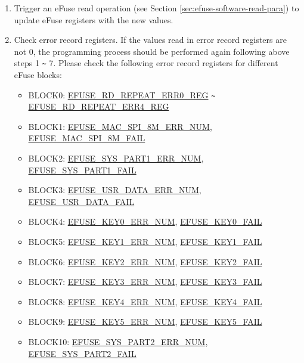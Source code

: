 \documentclass[main\_\_EN.tex]{subfiles}
\begin{document}
\begin{enumerate}
\item Trigger an eFuse read operation (see Section \ref{sec:efuse-software-read-para}) to update eFuse registers with the new values.
\item Check error record registers. If the values read in error record registers are not 0, the programming process should be performed again following above steps 1 \verb+~+ 7. Please check the following error record registers for different eFuse blocks:
\begin{itemize}
    \item BLOCK0: \hyperref[regdesc:EFUSERDREPEATERR0REG]{EFUSE\_RD\_REPEAT\_ERR0\_REG} \verb+~+ \hyperref[regdesc:EFUSERDREPEATERR4REG]{EFUSE\_RD\_REPEAT\_ERR4\_REG}
    \item BLOCK1: \hyperref[fielddesc:EFUSEMACSPI8MERRNUM] {EFUSE\_MAC\_SPI\_8M\_ERR\_NUM}, \hyperref[fielddesc:EFUSEMACSPI8MFAIL] {EFUSE\_MAC\_SPI\_8M\_FAIL}
    \item BLOCK2: \hyperref[fielddesc:EFUSESYSPART1ERRNUM] {EFUSE\_SYS\_PART1\_ERR\_NUM}, \hyperref[fielddesc:EFUSESYSPART1FAIL] {EFUSE\_SYS\_PART1\_FAIL}
    \item BLOCK3: \hyperref[fielddesc:EFUSEUSRDATAERRNUM] {EFUSE\_USR\_DATA\_ERR\_NUM}, \hyperref[fielddesc:EFUSEUSRDATAFAIL] {EFUSE\_USR\_DATA\_FAIL}
    \item BLOCK4: \hyperref[fielddesc:EFUSEKEY0ERRNUM] {EFUSE\_KEY0\_ERR\_NUM}, \hyperref[fielddesc:EFUSEKEY0FAIL] {EFUSE\_KEY0\_FAIL}
    \item BLOCK5: \hyperref[fielddesc:EFUSEKEY1ERRNUM] {EFUSE\_KEY1\_ERR\_NUM}, \hyperref[fielddesc:EFUSEKEY1FAIL] {EFUSE\_KEY1\_FAIL}
    \item BLOCK6: \hyperref[fielddesc:EFUSEKEY2ERRNUM] {EFUSE\_KEY2\_ERR\_NUM}, \hyperref[fielddesc:EFUSEKEY2FAIL] {EFUSE\_KEY2\_FAIL}
    \item BLOCK7: \hyperref[fielddesc:EFUSEKEY3ERRNUM] {EFUSE\_KEY3\_ERR\_NUM}, \hyperref[fielddesc:EFUSEKEY3FAIL] {EFUSE\_KEY3\_FAIL}
    \item BLOCK8: \hyperref[fielddesc:EFUSEKEY4ERRNUM] {EFUSE\_KEY4\_ERR\_NUM}, \hyperref[fielddesc:EFUSEKEY4FAIL] {EFUSE\_KEY4\_FAIL}
    \item BLOCK9: \hyperref[fielddesc:EFUSEKEY5ERRNUM] {EFUSE\_KEY5\_ERR\_NUM}, \hyperref[fielddesc:EFUSEKEY5FAIL] {EFUSE\_KEY5\_FAIL}
    \item BLOCK10: \hyperref[fielddesc:EFUSESYSPART2ERRNUM] {EFUSE\_SYS\_PART2\_ERR\_NUM}, \hyperref[fielddesc:EFUSESYSPART2FAIL] {EFUSE\_SYS\_PART2\_FAIL}
\end{itemize}
\end{enumerate}
\end{document}
